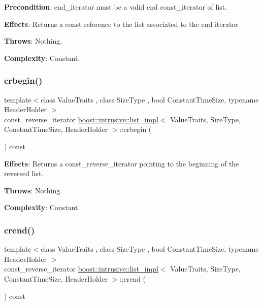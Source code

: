 {\bfseries Precondition}\+: end\+\_\+iterator must be a valid end const\+\_\+iterator of list.

{\bfseries Effects}\+: Returns a const reference to the list associated to the end iterator

{\bfseries Throws}\+: Nothing.

{\bfseries Complexity}\+: Constant. \mbox{\label{classboost_1_1intrusive_1_1list__impl_aaec6d64d661acea3e7b92be73332618a}} 
\subsubsection{\texorpdfstring{crbegin()}{crbegin()}}
{\footnotesize\ttfamily template$<$class Value\+Traits , class Size\+Type , bool Constant\+Time\+Size, typename Header\+Holder $>$ \\
const\+\_\+reverse\+\_\+iterator \hyperlink{classboost_1_1intrusive_1_1list__impl}{boost\+::intrusive\+::list\+\_\+impl}$<$ Value\+Traits, Size\+Type, Constant\+Time\+Size, Header\+Holder $>$\+::crbegin (\begin{DoxyParamCaption}{ }\end{DoxyParamCaption}) const\hspace{0.3cm}{\ttfamily [inline]}}

{\bfseries Effects}\+: Returns a const\+\_\+reverse\+\_\+iterator pointing to the beginning of the reversed list.

{\bfseries Throws}\+: Nothing.

{\bfseries Complexity}\+: Constant. \mbox{\label{classboost_1_1intrusive_1_1list__impl_a9b1515c25e9402cb27796dfeb8236baf}} 
\subsubsection{\texorpdfstring{crend()}{crend()}}
{\footnotesize\ttfamily template$<$class Value\+Traits , class Size\+Type , bool Constant\+Time\+Size, typename Header\+Holder $>$ \\
const\+\_\+reverse\+\_\+iterator \hyperlink{classboost_1_1intrusive_1_1list__impl}{boost\+::intrusive\+::list\+\_\+impl}$<$ Value\+Traits, Size\+Type, Constant\+Time\+Size, Header\+Holder $>$\+::crend (\begin{DoxyParamCaption}{ }\end{DoxyParamCaption}) const\hspace{0.3cm}{\ttfamily [inline]}}

